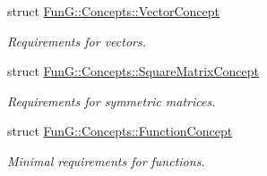 \begin{DoxyCompactItemize}
struct \hyperlink{structFunG_1_1Concepts_1_1VectorConcept}{Fun\-G\-::\-Concepts\-::\-Vector\-Concept}
\begin{DoxyCompactList}\small\item\em Requirements for vectors. \end{DoxyCompactList}\item 
struct \hyperlink{structFunG_1_1Concepts_1_1SquareMatrixConcept}{Fun\-G\-::\-Concepts\-::\-Square\-Matrix\-Concept}
\begin{DoxyCompactList}\small\item\em Requirements for symmetric matrices. \end{DoxyCompactList}\item 
struct \hyperlink{structFunG_1_1Concepts_1_1FunctionConcept}{Fun\-G\-::\-Concepts\-::\-Function\-Concept}
\begin{DoxyCompactList}\small\item\em Minimal requirements for functions. \end{DoxyCompactList}\end{DoxyCompactItemize}
